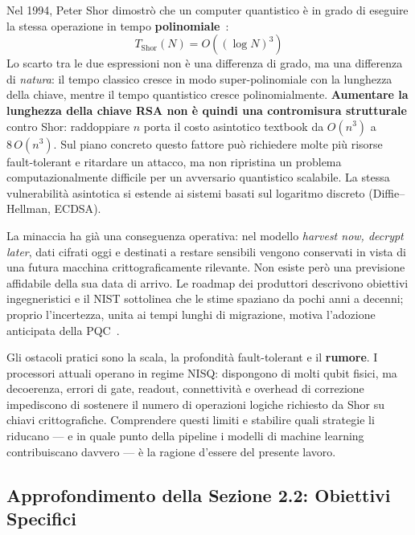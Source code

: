 \begin{onehalfspace}
Nel 1994, Peter Shor dimostrò che un computer quantistico è in grado di eseguire la stessa operazione in tempo \textbf{polinomiale}~\cite{shor1994}:
\begin{equation}
    T_{\text{Shor}}(N) = O\!\left((\log N)^3\right)
    \label{eq:shor_obiettivi}
\end{equation}
Lo scarto tra le due espressioni non è una differenza di grado, ma una differenza di \textit{natura}: il tempo classico cresce in modo super-polinomiale con la lunghezza della chiave, mentre il tempo quantistico cresce polinomialmente. \textbf{Aumentare la lunghezza della chiave RSA non è quindi una contromisura strutturale} contro Shor: raddoppiare $n$ porta il costo asintotico textbook da $O(n^3)$ a $8\,O(n^3)$. Sul piano concreto questo fattore può richiedere molte più risorse fault-tolerant e ritardare un attacco, ma non ripristina un problema computazionalmente difficile per un avversario quantistico scalabile. La stessa vulnerabilità asintotica si estende ai sistemi basati sul logaritmo discreto (Diffie--Hellman, \ac{ECDSA}).

La minaccia ha già una conseguenza operativa: nel modello \textit{harvest now, decrypt later}, dati cifrati oggi e destinati a restare sensibili vengono conservati in vista di una futura macchina crittograficamente rilevante. Non esiste però una previsione affidabile della sua data di arrivo. Le roadmap dei produttori descrivono obiettivi ingegneristici e il \ac{NIST} sottolinea che le stime spaziano da pochi anni a decenni; proprio l'incertezza, unita ai tempi lunghi di migrazione, motiva l'adozione anticipata della \ac{PQC}~\cite{nist_pqc_explainer2026,ibm_roadmap2025}.

Gli ostacoli pratici sono la scala, la profondità fault-tolerant e il \textbf{rumore}. I processori attuali operano in regime \ac{NISQ}: dispongono di molti qubit fisici, ma decoerenza, errori di gate, readout, connettività e overhead di correzione impediscono di sostenere il numero di operazioni logiche richiesto da Shor su chiavi crittografiche. Comprendere questi limiti e stabilire quali strategie li riducano --- e in quale punto della pipeline i modelli di machine learning contribuiscano davvero --- è la ragione d'essere del presente lavoro.

\subsection{Approfondimento della Sezione 2.2: Obiettivi Specifici}
\label{app:obiettivi:specifici}


\end{onehalfspace}
